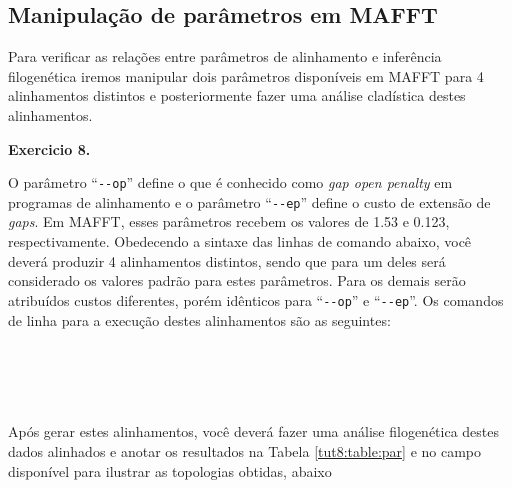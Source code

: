 \begin{refsection}
\subsection{Manipulação de parâmetros em MAFFT}\label{tut8:par:op}

Para verificar as relações entre parâmetros de alinhamento e inferência filogenética iremos manipular dois parâmetros disponíveis em MAFFT para 4 alinhamentos distintos e posteriormente fazer uma análise cladística destes alinhamentos.\\


\begin{blackBlock}{\textbf{Exercicio 8.}}\label{tut8:ex:8.7}

O parâmetro ``\texttt{-{}-op}'' define o que é conhecido como \textit{gap open penalty} em programas de alinhamento e o parâmetro ``\texttt{-{}-ep}'' define o custo de extensão de \textit{gaps}. Em MAFFT, esses parâmetros recebem os valores de 1.53 e 0.123, respectivamente. Obedecendo a sintaxe das linhas de comando abaixo, você deverá produzir 4 alinhamentos distintos, sendo que para um deles será considerado os valores padrão para estes parâmetros. Para os demais serão atribuídos custos diferentes, porém idênticos para ``\texttt{-{}-op}'' e ``\texttt{-{}-ep}''. Os comandos de linha para a execução destes alinhamentos são as seguintes:\\

\scriptsize
{}\\
\indent{}\\
\indent{}\\
\indent{}\\
\normalsize

Após gerar estes alinhamentos, você deverá fazer uma análise filogenética destes dados alinhados e anotar os resultados na Tabela \ref{tut8:table:par} e no campo disponível para ilustrar as topologias obtidas, abaixo

\end{blackBlock}

\newpage
\pagestyle{fancy}
\begin{center}


\end{center}
\end{refsection}
